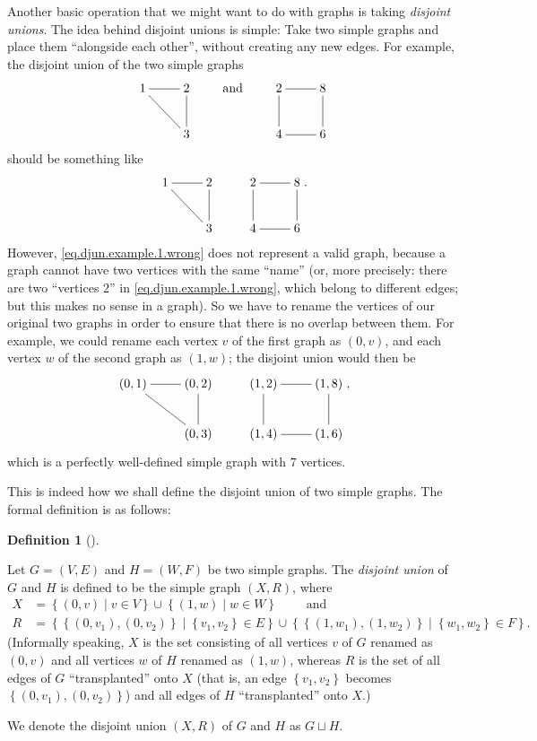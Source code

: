 \documentclass[numbers=enddot,12pt,final,onecolumn,notitlepage]{scrartcl}%
\makeatletter
\theoremstyle{definition}
\newtheorem{defi}[theo]{Definition}
\newenvironment{definition}[1][]
{\begin{defi}[#1]\begin{leftbar}}
{\end{leftbar}\end{defi}}
\newcommand{\set}[1]{\left\{ #1 \right\}}
\newcommand{\tup}[1]{\left( #1 \right)}
\newcommand{\are}{\ar@{-}}
\makeatother
\begin{document}
Another basic operation that we might want to do with graphs is
taking \textit{disjoint unions}.
The idea behind disjoint unions is simple:
Take two simple graphs and place them ``alongside each other'',
without creating any new edges.
For example, the disjoint union of the two simple graphs
\begin{equation}
\xymatrix{
1 \are[r] \are[rd] & 2 \are[d] \\
& 3
}
\qquad \text{ and } \qquad
\xymatrix{
2 \are[r] \are[d] & 8 \are[d] \\
4 \are[r] & 6
}
\label{eq.djun.example.1.two-graphs}
\end{equation}
should be something like
\begin{equation}
\xymatrix{
1 \are[r] \are[rd] & 2 \are[d] & 2 \are[r] \are[d] & 8 \are[d] \\
& 3 & 4 \are[r] & 6
} .
\label{eq.djun.example.1.wrong}
\end{equation}
However, \eqref{eq.djun.example.1.wrong} does not represent a
valid graph, because a graph cannot have two vertices with the
same ``name'' (or, more precisely: there are two
``vertices $2$'' in \eqref{eq.djun.example.1.wrong},
which belong to different edges; but this makes no sense
in a graph).
So we have to rename the vertices of our original two graphs
in order to ensure that there is no overlap between them.
For example, we could rename each vertex $v$ of the first graph
as $\tup{0, v}$, and each vertex $w$ of the second graph as
$\tup{1, w}$;
the disjoint union would then be
\begin{equation}
\xymatrix{
\tup{0,1} \are[r] \are[rd] & \tup{0,2} \are[d] & \tup{1,2} \are[r] \are[d] & \tup{1,8} \are[d] \\
& \tup{0,3} & \tup{1,4} \are[r] & \tup{1,6}
} ,
\label{eq.djun.example.1.right}
\end{equation}
which is a perfectly well-defined simple graph with $7$
vertices.

This is indeed how we shall define the disjoint union of two
simple graphs.
The formal definition is as follows:

\begin{definition} \label{def.djun.simple}
Let $G = \tup{V, E}$ and $H = \tup{W, F}$ be two simple graphs.
The \textit{disjoint union} of $G$ and $H$ is defined to be
the simple graph $\tup{X, R}$, where
\begin{align*}
X &= \set{ \tup{0, v} \mid v \in V } \cup \set{ \tup{1, w} \mid w \in W }
\qquad \text{ and} \\
R &= \set{ \set{\tup{0, v_1}, \tup{0, v_2}} \mid \set{v_1, v_2} \in E }
     \cup
	 \set{ \set{\tup{1, w_1}, \tup{1, w_2}} \mid \set{w_1, w_2} \in F } .
\end{align*}
(Informally speaking, $X$ is the set consisting of all vertices
$v$ of $G$ renamed as $\tup{0, v}$ and all vertices $w$ of $H$
renamed as $\tup{1, w}$, whereas $R$ is the set of all edges
of $G$ ``transplanted'' onto $X$ (that is, an edge $\set{v_1, v_2}$
becomes $\set{\tup{0, v_1}, \tup{0, v_2}}$) and all edges of $H$
``transplanted'' onto $X$.)

We denote the disjoint union $\tup{X, R}$ of $G$ and $H$ as
$G \sqcup H$.
\end{definition}
\end{document}
